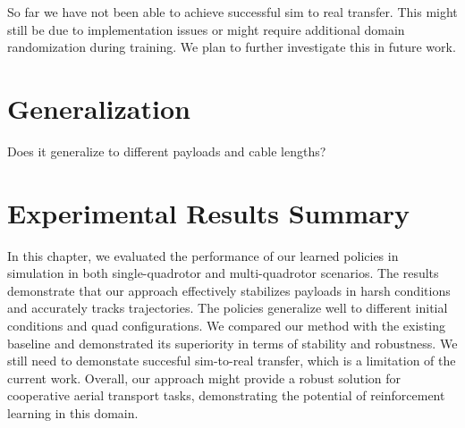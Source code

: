 So far we have not been able to achieve successful sim to real transfer. This might still be due to implementation issues or might require additional domain randomization during training. We plan to further investigate this in future work.

\section{Generalization}
Does it generalize to different payloads and cable lengths?
\section{Experimental Results Summary}
In this chapter, we evaluated the performance of our learned policies in simulation in both single-quadrotor and multi-quadrotor scenarios. The results demonstrate that our approach effectively stabilizes payloads in harsh conditions and accurately tracks trajectories. The policies generalize well to different initial conditions and quad configurations. We compared our method with the existing baseline and demonstrated its superiority in terms of stability and robustness. We still need to demonstate succesful sim-to-real transfer, which is a limitation of the current work. Overall, our approach might provide a robust solution for cooperative aerial transport tasks, demonstrating the potential of reinforcement learning in this domain.